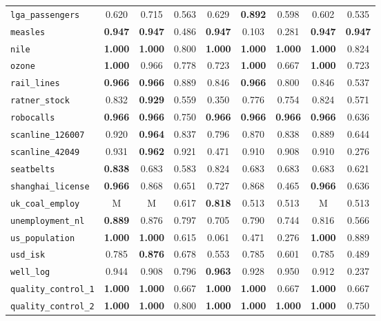 \begin{tabular}{lcccccccc}
\verb+lga_passengers+ & 0.620 & 0.715 & 0.563 & 0.629 & \textbf{0.892} & 0.598 & 0.602 & 0.535\\
\verb+measles+ & \textbf{0.947} & \textbf{0.947} & 0.486 & \textbf{0.947} & 0.103 & 0.281 & \textbf{0.947} & \textbf{0.947}\\
\verb+nile+ & \textbf{1.000} & \textbf{1.000} & 0.800 & \textbf{1.000} & \textbf{1.000} & \textbf{1.000} & \textbf{1.000} & 0.824\\
\verb+ozone+ & \textbf{1.000} & 0.966 & 0.778 & 0.723 & \textbf{1.000} & 0.667 & \textbf{1.000} & 0.723\\
\verb+rail_lines+ & \textbf{0.966} & \textbf{0.966} & 0.889 & 0.846 & \textbf{0.966} & 0.800 & 0.846 & 0.537\\
\verb+ratner_stock+ & 0.832 & \textbf{0.929} & 0.559 & 0.350 & 0.776 & 0.754 & 0.824 & 0.571\\
\verb+robocalls+ & \textbf{0.966} & \textbf{0.966} & 0.750 & \textbf{0.966} & \textbf{0.966} & \textbf{0.966} & \textbf{0.966} & 0.636\\
\verb+scanline_126007+ & 0.920 & \textbf{0.964} & 0.837 & 0.796 & 0.870 & 0.838 & 0.889 & 0.644\\
\verb+scanline_42049+ & 0.931 & \textbf{0.962} & 0.921 & 0.471 & 0.910 & 0.908 & 0.910 & 0.276\\
\verb+seatbelts+ & \textbf{0.838} & 0.683 & 0.583 & 0.824 & 0.683 & 0.683 & 0.683 & 0.621\\
\verb+shanghai_license+ & \textbf{0.966} & 0.868 & 0.651 & 0.727 & 0.868 & 0.465 & \textbf{0.966} & 0.636\\
\verb+uk_coal_employ+ & M & M & 0.617 & \textbf{0.818} & 0.513 & 0.513 & M & 0.513\\
\verb+unemployment_nl+ & \textbf{0.889} & 0.876 & 0.797 & 0.705 & 0.790 & 0.744 & 0.816 & 0.566\\
\verb+us_population+ & \textbf{1.000} & \textbf{1.000} & 0.615 & 0.061 & 0.471 & 0.276 & \textbf{1.000} & 0.889\\
\verb+usd_isk+ & 0.785 & \textbf{0.876} & 0.678 & 0.553 & 0.785 & 0.601 & 0.785 & 0.489\\
\verb+well_log+ & 0.944 & 0.908 & 0.796 & \textbf{0.963} & 0.928 & 0.950 & 0.912 & 0.237\\
\midrule
\verb+quality_control_1+ & \textbf{1.000} & \textbf{1.000} & 0.667 & \textbf{1.000} & \textbf{1.000} & 0.667 & \textbf{1.000} & 0.667\\
\verb+quality_control_2+ & \textbf{1.000} & \textbf{1.000} & 0.800 & \textbf{1.000} & \textbf{1.000} & \textbf{1.000} & \textbf{1.000} & 0.750\\

\end{tabular}
